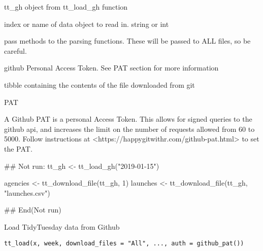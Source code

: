 \documentclass[letterpaper]{book}
\begin{document}
%
\begin{Arguments}
\begin{ldescription}
\item[\code{tt}] tt\_gh object from tt\_load\_gh function

\item[\code{x}] index or name of data object to read in. string or int

\item[\code{...}] pass methods to the parsing functions. These will be passed to
ALL files, so be careful.

\item[\code{auth}] github Personal Access Token. See PAT section for more
information
\end{ldescription}
\end{Arguments}
%
\begin{Value}
tibble containing the contents of the file downloaded from git
\end{Value}
%
\begin{Section}{PAT}


A Github PAT is a personal Access Token. This allows for signed queries to
the github api, and increases the limit on the number of requests allowed
from 60 to 5000. Follow instructions at
<https://happygitwithr.com/github-pat.html> to set the PAT.
\end{Section}
%
\begin{Examples}
\begin{ExampleCode}
## Not run:
tt_gh <- tt_load_gh("2019-01-15")

agencies <- tt_download_file(tt_gh, 1)
launches <- tt_download_file(tt_gh, "launches.csv")

## End(Not run)
\end{ExampleCode}
\end{Examples}
%
\begin{Description}\relax
Load TidyTuesday data from Github
\end{Description}
%
\begin{Usage}
\begin{verbatim}
tt_load(x, week, download_files = "All", ..., auth = github_pat())
\end{verbatim}
\end{Usage}
%
\end{document}
